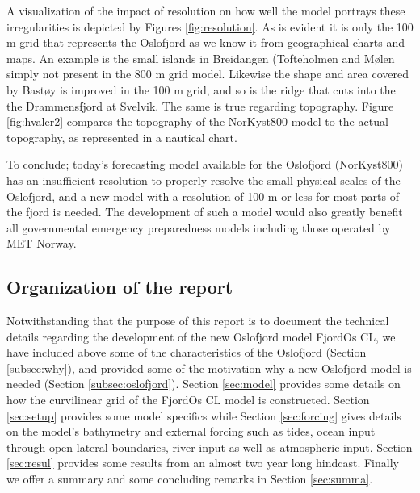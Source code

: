 A visualization of the impact of resolution on how well the model portrays these irregularities is depicted by Figures \ref{fig:resolution}. As is evident it is only the 100 m grid that represents the Oslofjord as we know it from geographical charts and maps. An example is the small islands in Breidangen (Tofteholmen and M{\o}len simply not present in the 800 m grid model. Likewise the shape and area covered by Bast{\o}y is improved in the 100 m grid, and so is the ridge that cuts into the the Drammensfjord at Svelvik. The same is true regarding topography. Figure \ref{fig:hvaler2} compares the topography of the NorKyst800 model to the actual topography, as represented in a nautical chart. 

To conclude; today's forecasting model available for the Oslofjord (NorKyst800) has an insufficient resolution to properly resolve the small physical scales of the Oslofjord, and a new model with a resolution of 100 m or less for most parts of the fjord is needed. The development of such a model would also greatly benefit all governmental emergency preparedness models including those operated by MET Norway.   


\subsection{Organization of the report}
Notwithstanding that the purpose of this report is to document the technical details regarding the development of the new Oslofjord model FjordOs CL, we have included above some of the characteristics of the Oslofjord (Section \ref{subsec:why}), and provided some of the motivation why a new Oslofjord model is needed (Section \ref{subsec:oslofjord}). Section \ref{sec:model} provides some details on how the curvilinear grid of the FjordOs CL model is constructed. Section \ref{sec:setup} provides some model specifics while Section \ref{sec:forcing} gives details on the model's bathymetry and external forcing such as tides, ocean input through open lateral boundaries, river input as well as atmospheric input. Section \ref{sec:resul} provides some results from an almost two year long hindcast. Finally we offer a summary and some concluding remarks in Section \ref{sec:summa}. 
